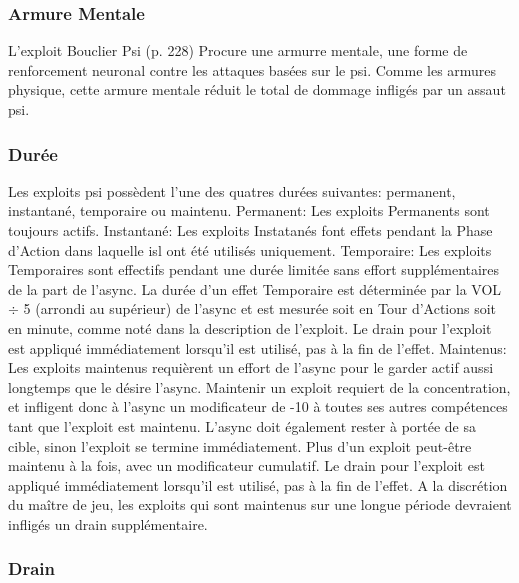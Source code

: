 \subsubsection{Armure Mentale} 

L'exploit Bouclier Psi (p. 228) Procure une armurre mentale, une forme de renforcement neuronal contre les attaques basées sur le psi. Comme les armures physique, cette armure mentale réduit le total de dommage infligés par un assaut psi. 

\subsubsection{Durée} 

Les exploits psi possèdent l'une des quatres durées suivantes: permanent, instantané, temporaire ou maintenu. Permanent: Les exploits Permanents sont toujours actifs. Instantané: Les exploits Instatanés font effets pendant la Phase d'Action dans laquelle isl ont été utilisés uniquement. Temporaire: Les exploits Temporaires sont effectifs pendant une durée limitée sans effort supplémentaires de la part de l'async. La durée d'un effet Temporaire est déterminée par la VOL $\div$ 5 (arrondi au supérieur) de l'async et est mesurée soit en Tour d'Actions soit en minute, comme noté dans la description de l'exploit. Le drain pour l'exploit est appliqué immédiatement lorsqu'il est utilisé, pas à la fin de l'effet. Maintenus: Les exploits maintenus requièrent un effort de l'async pour le garder actif aussi longtemps que le désire l'async. Maintenir un exploit requiert de la concentration, et infligent donc à l'async un modificateur de -10 à toutes ses autres compétences tant que l'exploit est maintenu. L'async doit également rester à portée de sa cible, sinon l'exploit se termine immédiatement. Plus d'un exploit peut-être maintenu à la fois, avec un modificateur cumulatif. Le drain pour l'exploit est appliqué immédiatement lorsqu'il est utilisé, pas à la fin de l'effet. A la discrétion du maître de jeu, les exploits qui sont maintenus sur une longue période devraient infligés un drain supplémentaire. 

\subsubsection{Drain} 

